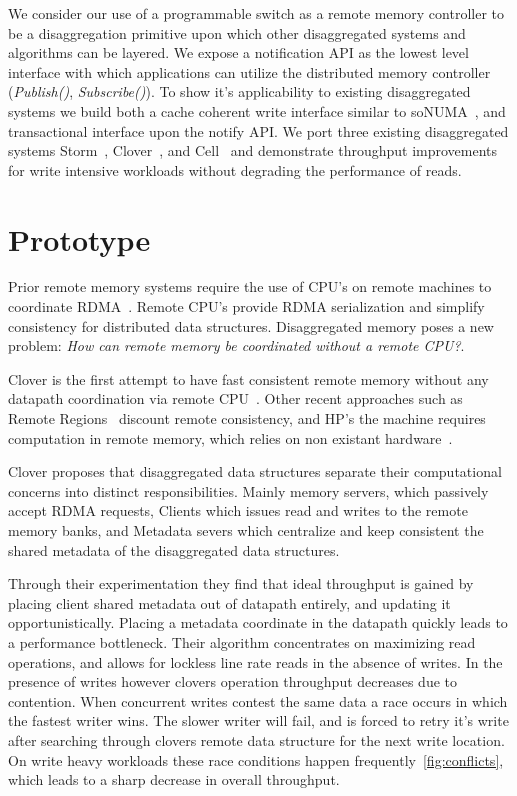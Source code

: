 We consider our use of a programmable switch as a remote memory
controller to be a disaggregation primitive upon which other
disaggregated systems and algorithms can be layered. We expose a
notification API as the lowest level interface with which applications
can utilize the distributed memory controller (\textit{Publish()},
\textit{Subscribe()}). To show it's applicability to existing
disaggregated systems we build both a cache coherent write interface
similar to soNUMA~\cite{sonuma}, and transactional interface upon the
notify API. We port three existing disaggregated systems
Storm~\cite{storm}, Clover~\cite{clover}, and Cell~\cite{cell} and
demonstrate throughput improvements for write intensive workloads
without degrading the performance of reads.


\section{Prototype}
Prior remote memory systems require the use of CPU's on remote
machines to coordinate RDMA~\cite{cell,sonuma,storm,erpc,farm}. Remote
CPU's provide RDMA serialization and simplify consistency for
distributed data structures. Disaggregated memory poses a new problem:
\textit{How can remote memory be coordinated without a remote CPU?}.

Clover is the first attempt to have fast consistent remote memory
without any datapath coordination via remote CPU~\cite{clover}. Other
recent approaches such as Remote Regions~\cite{reigons} discount
remote consistency, and HP's the machine requires computation in
remote memory, which relies on non existant
hardware~\cite{aguilera2019designing}.

Clover proposes that disaggregated data structures separate their
computational concerns into distinct responsibilities. Mainly memory
servers, which passively accept RDMA requests, Clients which issues read and
writes to the remote memory banks, and Metadata severs which
centralize and keep consistent the shared metadata of the disaggregated
data structures.

Through their experimentation they find that ideal throughput is
gained by placing client shared metadata out of datapath entirely, and
updating it opportunistically. Placing a metadata coordinate in the
datapath quickly leads to a performance bottleneck. Their algorithm
concentrates on maximizing read operations, and allows for lockless
line rate reads in the absence of writes. In the presence of writes
however clovers operation throughput decreases due to contention. When
concurrent writes contest the same data a race occurs in which the
fastest writer wins. The slower writer will fail, and is forced to
retry it's write after searching through clovers remote data structure
for the next write location. On write heavy workloads these race
conditions happen frequently~\ref{fig:conflicts}, which leads to a
sharp decrease in overall throughput.

